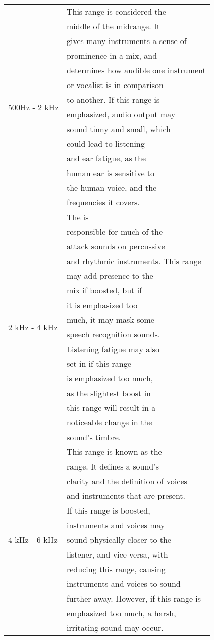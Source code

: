 \begin{longtable}[h!]{| l | l|}
		\hline
		\multirow{14}{*}{500Hz - 2 kHz} & This range is considered the \\ & middle of the midrange. It \\ & gives many instruments a sense of \\ & prominence in a mix, and \\ & determines how audible one instrument \\ & or vocalist is in comparison \\ & to another. If this range is \\ & emphasized, audio output may \\ & sound tinny and small, which \\ & could lead to listening \\ & and ear fatigue, as the \\ & human ear is sensitive to \\ & the human voice, and the \\ & frequencies it covers. \\ 
		\hline
		\multirow{16}{*}{2 kHz - 4 kHz} & The \say{upper midrange} is \\ & responsible for much of the \\ & attack sounds on percussive \\ & and rhythmic instruments. This range \\ & may add presence to the \\ & mix if boosted, but if \\ & it is emphasized too \\ & much, it may mask some \\ & speech recognition sounds. \\ & Listening fatigue may also \\ & set in if this range \\ & is emphasized too much, \\ & as the slightest boost in \\ & this range will result in a \\ & noticeable change in the \\ & sound's timbre. \\ 
		\hline
		\multirow{13}{*}{4 kHz - 6 kHz} & This range is known as the \\ & \say{presence} range. It defines a sound's \\ & clarity and the definition of voices \\ & and instruments that are present. \\ & If this range is boosted, \\ & instruments and voices may \\ & sound physically closer to the \\ & listener, and vice versa, with \\ & reducing this range, causing \\ & instruments and voices to sound \\ & further away. However, if this range is \\ & emphasized too much, a harsh, \\ & irritating sound may occur. \\

\end{longtable}
